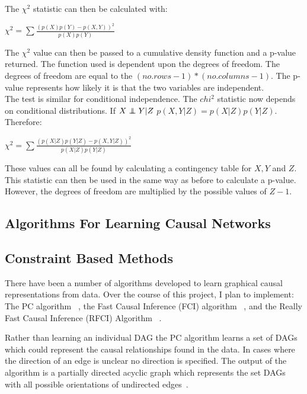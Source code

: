 \documentclass{UoYCSproject}
\newcommand\independent{\protect\mathpalette{\protect\independenT}{\perp}}
\def\independenT#1#2{\mathrel{\rlap{$#1#2$}\mkern2mu{#1#2}}}
\begin{document}
The $\chi^2$ statistic can then be calculated with:

\begin{center}
	$\chi^2 = \sum\frac{(p(X)p(Y)-p(X,Y))^2}{p(X)p(Y)}$
\end{center}

The $\chi^2$ value can then be passed to a cumulative density function and a p-value returned. The function used is dependent upon the degrees of freedom. The degrees of freedom are equal to the $(no. rows -1)*(no. columns -1)$. The p-value represents how likely it is that the two variables are independent.\\

The test is similar for conditional independence. The $chi^2$ statistic now depends on conditional distributions. If $X \independent Y | Z$ $p(X,Y|Z) = p(X|Z)p(Y|Z)$. Therefore:\\

\begin{center}
	$\chi^2 = \sum\frac{(p(X|Z)p(Y|Z)-p(X,Y|Z))^2}{p(X|Z)p(Y|Z)}$
\end{center}

These values can all be found by calculating a contingency table for $X,Y $ and $ Z$.\\

This statistic can then be used in the same way as before to calculate a p-value. However, the degrees of freedom are multiplied by the possible values of $Z -1$. 

\subsection{Algorithms For Learning Causal Networks}
\subsection{Constraint Based Methods}
There have been a number of algorithms developed to learn graphical causal representations from data. Over the course of this project, I plan to implement: The PC algorithm ~\parencite{spirtes1991algorithm}, the Fast Causal Inference (FCI) algorithm ~\parencite{colombo2012learning}, and the Really Fast Causal Inference (RFCI) Algorithm ~\parencite{colombo2012learning}.

Rather than learning an individual DAG the PC algorithm learns a set of DAGs which could represent the causal relationships found in the data. In cases where the direction of an edge is unclear no direction is specified. The output of the algorithm is a partially directed acyclic graph which represents the set DAGs with all possible orientations of undirected edges~\parencite{spirtes1991algorithm}.
\end{document}
